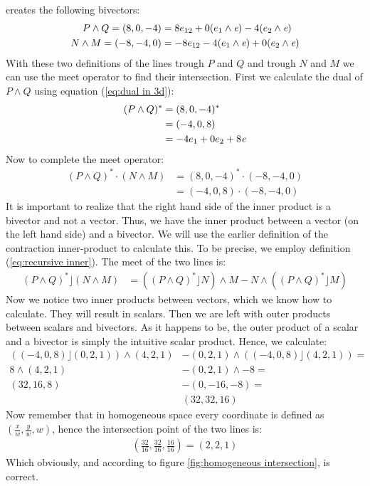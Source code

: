 \documentclass[10pt]{report}
\begin{document}
creates the following bivectors:
\begin{align*}
P\wedge Q = ( 8,  0, -4) &=  8e_{12} + 0(e_1\wedge \emph{e}) - 4(e_2\wedge \emph{e}) \\
N\wedge M = (-8, -4,  0) &= -8e_{12} - 4(e_1\wedge \emph{e}) + 0(e_2\wedge \emph{e})
\end{align*}
With these two definitions of the lines trough $P$ and $Q$ and
trough $N$ and $M$ we can use the meet operator to find their
intersection. First we calculate the dual of $P\wedge Q$ using
equation (\ref{eq:dual in 3d}):
\begin{align*}
    (P\wedge Q)^* &= (8, 0, -4)^*   \\
                  &= (-4, 0, 8)     \\
                  &= -4e_1 + 0e_2 + 8\emph{e}
\end{align*}
Now to complete the meet operator:
\begin{align*}
    (P\wedge Q)^* \cdot (N\wedge M) &= (8, 0, -4)^* \cdot (-8, -4, 0)  \\
                  &= (-4, 0, 8) \cdot (-8, -4, 0)
\end{align*}
It is important to realize that the right hand side of the inner
product is a bivector and not a vector. Thus, we have the inner
product between a vector (on the left hand side) and a bivector.
We will use the earlier definition of the contraction
inner-product to calculate this. To be precise, we employ
definition (\ref{eq:recursive inner}). The meet of the two lines
is:
\begin{align*}
    (P\wedge Q)^* \rfloor (N\wedge M) &= ((P\wedge Q)^*\rfloor N) \wedge M - N\wedge((P\wedge Q)^*\rfloor M)
\end{align*}
Now we notice two inner products between vectors, which we know
how to calculate. They will result in scalars. Then we are left
with outer products between scalars and bivectors. As it happens
to be, the outer product of a scalar and a bivector is simply the
intuitive scalar product. Hence, we calculate:
\begin{align*}
    ((-4, 0, 8)\rfloor (0, 2, 1)) \wedge (4, 2, 1) &- (0, 2, 1) \wedge((-4, 0, 8)\rfloor (4, 2, 1)) = \\
    8\wedge (4, 2, 1) &- (0, 2, 1)\wedge -8 = \\
    (32, 16, 8) &- (0, -16, -8) = \\
                &(32, 32, 16)
\end{align*}
Now remember that in homogeneous space every coordinate is defined
as $(\frac{x}{w}, \frac{y}{w}, w)$, hence the intersection point
of the two lines is:
\begin{align*}
    (\frac{32}{16}, \frac{32}{16}, \frac{16}{16}) = (2, 2, 1)
\end{align*}
Which obviously, and according to figure \ref{fig:homogeneous
intersection}, is correct.
\end{document}
